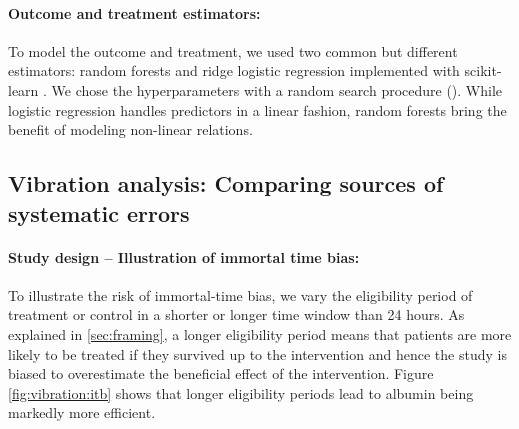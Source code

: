 \documentclass[10pt,letterpaper]{article}
\begin{document}
\paragraph{Outcome and treatment estimators:}

To model the outcome and treatment, we used two common but different
estimators: random forests and ridge logistic regression implemented with scikit-learn
\cite{pedregosa2011scikit}. We chose the
hyperparameters with a random search procedure (). While logistic regression handles
predictors in a linear fashion, random forests bring the benefit of modeling
non-linear relations.


\subsection*{Vibration analysis: Comparing sources of systematic errors}%
\label{sec:vibration_analysis_mimic_iv}


\paragraph{Study design -- Illustration of immortal time bias:}

To illustrate the risk of immortal-time bias, we vary the eligibility period of
treatment or control in a shorter or longer time window than 24 hours. As
explained in \autoref{sec:framing}, a longer eligibility period means that
patients are more likely to be treated if they survived up to the intervention
and hence the study is biased to overestimate the beneficial effect of the
intervention. Figure \ref{fig:vibration:itb} shows that longer eligibility
periods lead to albumin being markedly more efficient.
\end{document}
